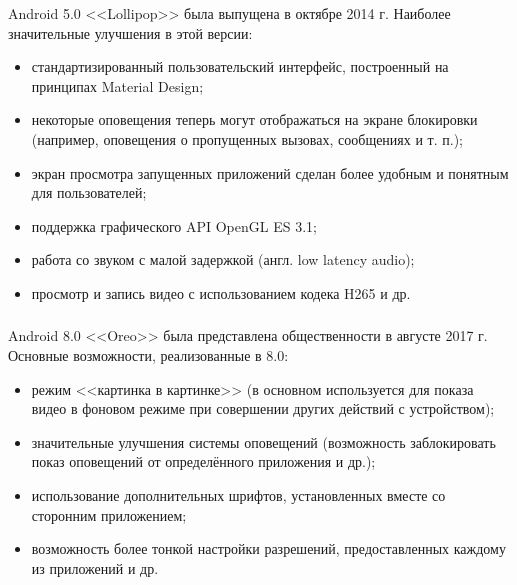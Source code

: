 Android 5.0 <<Lollipop>> была выпущена в октябре 2014 г. \cite{android_release_notes}
Наиболее значительные улучшения в этой версии:
\begin{itemize}
	\item стандартизированный пользовательский интерфейс, построенный на принципах Material Design;
	\item некоторые оповещения теперь могут отображаться на экране блокировки (например, оповещения о пропущенных вызовах, сообщениях и т. п.);
	\item экран просмотра запущенных приложений сделан более удобным и понятным для пользователей;
	\item поддержка графического API OpenGL ES 3.1;
	\item работа со звуком с малой задержкой (англ. low latency audio);
	\item просмотр и запись видео с использованием кодека H265 и др. \cite{android_lollipop}
\end{itemize}


\subsubsection{}
\label{subsub:android_platform:history:oreo}

Android 8.0 <<Oreo>> была представлена общественности в августе 2017 г. \cite{android_release_notes}
Основные возможности, реализованные в 8.0:
\begin{itemize}
	\item режим <<картинка в картинке>> (в основном используется для показа видео в фоновом режиме при совершении других действий с устройством);
	\item значительные улучшения системы оповещений (возможность заблокировать показ оповещений от определённого приложения и др.);
	\item использование дополнительных шрифтов, установленных вместе со сторонним приложением;
	\item возможность более тонкой настройки разрешений, предоставленных каждому из приложений и др. \cite{android_oreo}
\end{itemize}


\subsubsection{}
\label{subsub:android_platform:history:pie}

